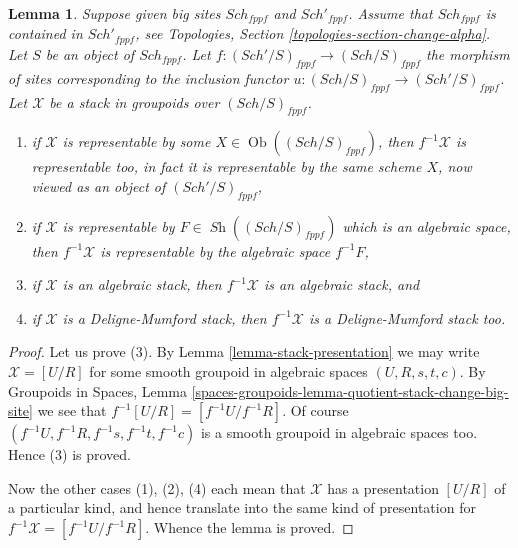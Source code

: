 \documentclass{stacks-project}
\theoremstyle{plain}
\newtheorem{lemma}[subsection]{Lemma}
\theoremstyle{definition}
\theoremstyle{remark}
\numberwithin{equation}{subsection}
\def\Sch{\mathit{Sch}}
\def\Ob{\mathop{\mathrm{Ob}}\nolimits}
\def\Sh{\mathop{\mathit{Sh}}\nolimits}
\begin{document}
\begin{lemma}
\label{lemma-change-big-site}
Suppose given big sites $\Sch_{fppf}$ and $\Sch'_{fppf}$.
Assume that $\Sch_{fppf}$ is contained in $\Sch'_{fppf}$,
see Topologies, Section \ref{topologies-section-change-alpha}.
Let $S$ be an object of $\Sch_{fppf}$.
Let $f : (\Sch'/S)_{fppf} \to (\Sch/S)_{fppf}$ the morphism
of sites corresponding to the inclusion functor
$u : (\Sch/S)_{fppf} \to (\Sch'/S)_{fppf}$.
Let $\mathcal{X}$ be a stack in groupoids over $(\Sch/S)_{fppf}$.
\begin{enumerate}
\item if $\mathcal{X}$ is representable by some
$X \in \Ob((\Sch/S)_{fppf})$, then
$f^{-1}\mathcal{X}$ is representable too, in fact it is representable by the
same scheme $X$, now viewed as an object of $(\Sch'/S)_{fppf}$,
\item if $\mathcal{X}$ is representable by
$F \in \Sh((\Sch/S)_{fppf})$ which is
an algebraic space, then $f^{-1}\mathcal{X}$ is representable
by the algebraic space $f^{-1}F$,
\item if $\mathcal{X}$ is an algebraic stack, then $f^{-1}\mathcal{X}$
is an algebraic stack, and
\item if $\mathcal{X}$ is a Deligne-Mumford stack, then $f^{-1}\mathcal{X}$
is a Deligne-Mumford stack too.
\end{enumerate}
\end{lemma}

\begin{proof}
Let us prove (3). By
Lemma \ref{lemma-stack-presentation}
we may write $\mathcal{X} = [U/R]$ for some smooth
groupoid in algebraic spaces $(U, R, s, t, c)$. By
Groupoids in Spaces,
Lemma \ref{spaces-groupoids-lemma-quotient-stack-change-big-site}
we see that $f^{-1}[U/R] = [f^{-1}U/f^{-1}R]$.
Of course $(f^{-1}U, f^{-1}R, f^{-1}s, f^{-1}t, f^{-1}c)$
is a smooth groupoid in algebraic spaces too. Hence (3) is proved.

\medskip\noindent
Now the other cases (1), (2), (4) each mean that $\mathcal{X}$ has
a presentation $[U/R]$ of a particular kind, and hence translate into the
same kind of presentation for $f^{-1}\mathcal{X} = [f^{-1}U/f^{-1}R]$.
Whence the lemma is proved.
\end{proof}
\end{document}

